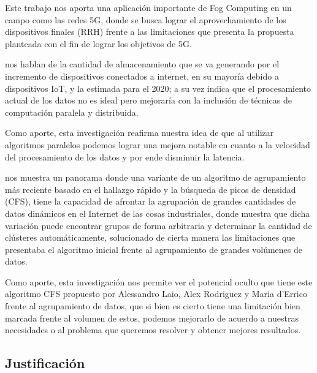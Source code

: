         Este trabajo nos aporta una aplicación importante de Fog Computing en un campo como las redes 5G, donde se busca lograr el aprovechamiento de los dispositivos finales (RRH) frente a las limitaciones que presenta la propuesta planteada con el fin de lograr los objetivos de 5G.\par     
        \vskip 0.3cm
        {\bf\cite{piccialli2018}} nos hablan de la cantidad de almacenamiento que se va generando por el incremento de dispositivos conectados a internet, en su mayoría debido a dispositivos IoT, y la estimada para el 2020; a su vez indica que el procesamiento actual de los datos no es ideal pero mejoraría con la inclusión de técnicas de computación paralela y distribuida.\par
        Como aporte, esta investigación reafirma nuestra idea de que al utilizar algoritmos paralelos podemos lograr una mejora notable en cuanto a la velocidad del procesamiento de los datos y por ende disminuir la latencia. \par
        \vskip 0.3cm
        {\bf\cite{shanmugapriya2018}} nos muestra un panorama donde una variante de un algoritmo de agrupamiento más reciente basado en el hallazgo rápido y la búsqueda de picos de densidad (CFS), tiene la capacidad de afrontar la agrupación de grandes cantidades de datos dinámicos en el Internet de las cosas industriales, donde muestra que dicha variación puede encontrar grupos de forma arbitraria y determinar la cantidad de clústeres automáticamente, solucionado de cierta manera las limitaciones que presentaba el algoritmo inicial frente al agrupamiento de grandes volúmenes de datos.\par
        Como aporte, esta investigación nos permite ver el potencial oculto que tiene este algoritmo CFS propuesto por Alessandro Laio, Alex Rodriguez y Maria d’Errico frente al agrupamiento de datos, que si bien es cierto tiene una limitación bien marcada frente al volumen de estos, podemos mejorarlo de acuerdo a nuestras necesidades o al problema que queremos resolver y obtener mejores resultados.\par

    \subsection{Justificación}
